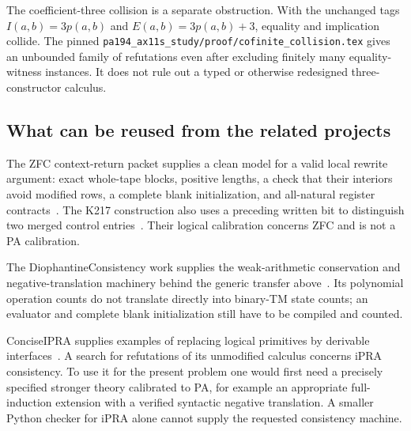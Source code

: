 The coefficient-three collision is a separate obstruction.  With the
unchanged tags $I(a,b)=3p(a,b)$ and $E(a,b)=3p(a,b)+3$, equality and
implication collide.  The pinned
\texttt{pa194\_ax11s\_study/proof/cofinite\_collision.tex} gives an
unbounded family of refutations even after excluding finitely many
equality-witness instances.  It does not rule out a typed or otherwise
redesigned three-constructor calculus.

\subsection{What can be reused from the related projects}

The ZFC context-return packet supplies a clean model for a valid local
rewrite argument: exact whole-tape blocks, positive lengths, a check that
their interiors avoid modified rows, a complete blank initialization, and
all-natural register contracts~\cite{zfc-context}. The K217 construction
also uses a preceding written bit to distinguish two merged control
entries~\cite{zfc}. Their logical calibration concerns ZFC
and is not a PA calibration.

The DiophantineConsistency work supplies the weak-arithmetic conservation
and negative-translation machinery behind the generic transfer above~\cite{diophantine}.
Its polynomial operation counts do not translate directly into binary-TM
state counts; an evaluator and complete blank initialization still have to
be compiled and counted.

ConciseIPRA supplies examples of replacing logical primitives by derivable
interfaces~\cite{concise}. A search for refutations of its unmodified calculus concerns
iPRA consistency.  To use it for the present problem one would first need
a precisely specified stronger theory calibrated to PA, for example an
appropriate full-induction extension with a verified syntactic
negative translation.  A smaller Python checker for iPRA alone cannot
supply the requested consistency machine.
